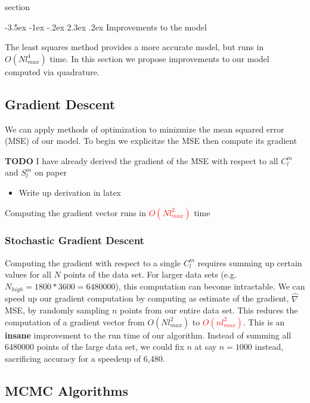 \documentclass[a4paper]{article}
\makeatletter
\renewcommand\section{\@startsection{section}{1}{\z@}%
                                  {-3.5ex \@plus -1ex \@minus -.2ex}%
                                  {2.3ex \@plus.2ex}%
                                  {\normalfont\normalsize\bfseries}}
\theoremstyle{definition}
\makeatother
\begin{document}
section

\section{Improvements to the model}

The least squares method provides a more accurate model, but runs in $O(Nl^4_{max})$ time. In this section we propose improvements to our model computed via quadrature.

\subsection{Gradient Descent}

We can apply methods of optimization to minizmize the mean squared error (MSE) of our model. To begin we explicitze the MSE then compute its gradient



\textbf{TODO} I have already derived the gradient of the MSE with respect to all $C_l^m$ and $S_l^m$ on paper
\begin{itemize}
    \item Write up derivation in latex
\end{itemize}

Computing the gradient vector runs in \textcolor{red}{$O(Nl_{max}^2)$} time


\subsubsection{Stochastic Gradient Descent}

Computing the gradient with respect to a single $C_l^m$ requires summing up certain values for all $N$ points of the data set. For larger data sets (e.g. $N_{high} = 1800 * 3600 = 6480000$), this
computation can become intractable. We can speed up our gradient computation by computing as estimate of the gradient, $\hat\nabla$MSE, by randomly sampling $n$ points from our entire
data set. This reduces the computation of a gradient vector from $O(Nl_{max}^2)$ to \textcolor{red}{$O(nl_{max}^2)$}. This is an \textbf{insane} improvement to the run time of our algorithm.
Instead of summing all 6480000 points of the large data set, we could fix $n$ at say $n = 1000$ instead, sacrificing accuracy for a speedeup of 6,480.

\subsection{MCMC Algorithms}
\end{document}
